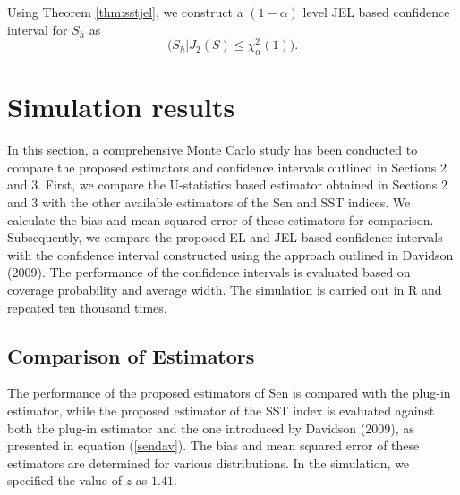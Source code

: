 \documentclass[11pt]{article}
\begin{document}
Using Theorem \ref{thm:sstjel}, we construct a $(1-\alpha)$ level JEL  based confidence interval for $S_h$  as
\begin{equation*}
  \Big(S_h|J_2(S) \le\chi_{\alpha}^2(1)\Big).
\end{equation*}






\section{Simulation results}

In this section, a comprehensive Monte Carlo study has been conducted to compare the proposed estimators and confidence intervals outlined in Sections 2 and 3.  First, we compare the U-statistics based estimator obtained in Sections 2 and 3 with the other available estimators of the Sen and SST indices. We calculate the bias and mean squared error of these estimators for comparison.  Subsequently, we compare the proposed EL and JEL-based confidence intervals with the confidence interval constructed using the approach outlined in Davidson (2009). The performance of the confidence intervals is evaluated based on coverage probability and average width. The simulation is carried out in R and repeated ten thousand times.

\subsection{Comparison of Estimators}
The performance of the proposed estimators of Sen is compared with the plug-in estimator, while the proposed estimator of the SST index is evaluated against both the plug-in estimator and the one introduced by Davidson (2009), as presented in equation (\ref{sendav}). The bias and mean squared error of these estimators are determined for various distributions. In the simulation, we specified the value of $z$ as $1.41$.
\end{document}
